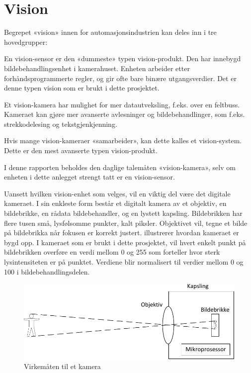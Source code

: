\documentclass[Visionprosjekt.tex]{subfiles}
\begin{document}
\section{Vision}

Begrepet «vision» innen for automasjonsindustrien kan deles inn i tre hovedgrupper:

\begin{description}[style=multiline,leftmargin=32mm]
	\item[Vision-sensor] En vision-sensor er den «dummeste» typen vision-produkt. Den har inne\-bygd bildebehandlingsenhet i kamerahuset. Enheten arbeider etter forhåndsprogrammerte regler, og gir ofte bare binære utgangsverdier.  Det er denne typen vision som er brukt i dette prosjektet.

     \item[Vision-kamera] Et vision-kamera har mulighet for mer datautveksling, f.eks. over en feltbuss. Kameraet kan gjøre mer avanserte avlesninger og bildebehandlinger, som f.eks. strekkodelesing og tekstgjenkjenning.

     \item[Vision-system] Hvis  mange vision-kameraer «samarbeider», kan dette kalles et vision-system. Dette er den mest avanserte typen vision-produkt.
\end{description}

I denne rapporten   beholdes den daglige talemåten «vision-kamera», selv om  enheten i dette anlegget  strengt tatt er en vision-sensor.

Uansett hvilken vision-enhet som velges, vil en viktig del være det digitale kameraet. I sin enkleste form består et digitalt kamera av et objektiv, en bildebrikke, en rådata bildebehandler, og en lystett kapsling. Bildebrikken har flere tusen små, lysfølsomme punkter, kalt piksler. Objektivet vil,  tegne et bilde på bildebrikka når  fokusen er korrekt justert.  illustrerer hvordan kameraet er bygd opp. I kameraet som er brukt i dette prosjektet, vil hvert enkelt punkt på bildebrikken overføre en verdi mellom 0 og 255 som forteller hvor sterk lysintensiteten er på  punktet. Verdiene blir normalisert til verdier mellom 0 og 100 i bildebehandlingsdelen. \cite{framework}

\begin{figure}[ht]
	\centering
		\includegraphics{bilder/kamera}
	\caption{Virkemåten til et kamera}
    \label{fig:kamera}
\end{figure}
\end{document}
